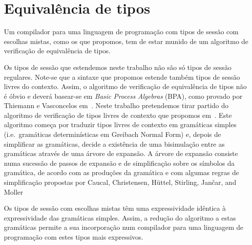 \section{Equivalência de tipos}

Um compilador para uma linguagem de programação com tipos de sessão
com escolhas mistas, como os que propomos, tem de estar munido de um
algoritmo de verificação de equivalência de tipos.

Os tipos de sessão que estendemos
neste trabalho não são só tipos de sessão regulares.
Note-se que a sintaxe que propomos estende também
tipos de sessão livres do contexto.
Assim, o algoritmo de verificação de equivalência de tipos 
não é óbvio e deverá basear-se em \emph{Basic Process Algebras}
(BPA), como provado por Thiemann e Vasconcelos em~\cite{ref-cfst}.
Neste trabalho pretendemos tirar partido do algoritmo de verificação
de tipos livres de contexto que propomos em~\cite{type-equiv}.
Este algoritmo começa por traduzir tipos livres de contexto
em gramáticas simples (i.e.\ gramáticas determinísticas
em Greibach Normal Form) e, depois de simplificar as 
gramáticas, decide a existência de uma bisimulação entre as gramáticas
através de uma árvore de expansão. 
A árvore de expansão consiste numa
sucessão de passos de expansão e de simplificação 
sobre os símbolos da gramática, de acordo com 
as produções da gramática e com algumas regras de simplificação
propostas por Caucal, Christensen,
H\"uttel, Stirling, Jan\v car, and Moller
~\cite{caucal1986decidabilite,DBLP:journals/iandc/ChristensenHS95,janvcar1999techniques}

Os tipos de sessão com escolhas mistas têm
uma expressividade idêntica à expressividade das gramáticas
simples. Assim, a redução do algoritmo a estas gramáticas
permite a sua incorporação num compilador
para uma linguagem de programação com estes tipos mais expressivos.

